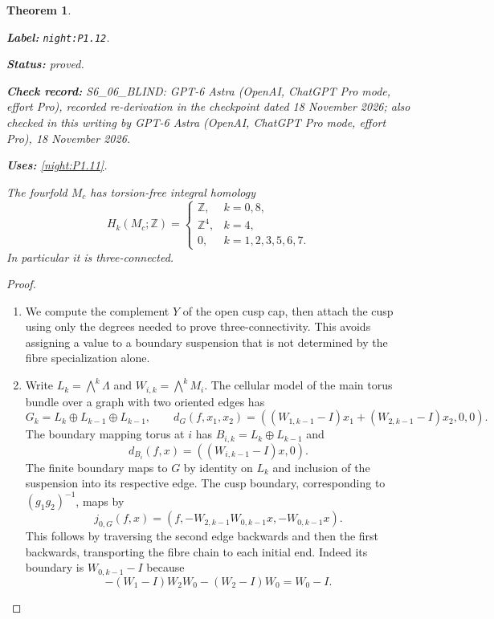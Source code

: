 \documentclass[11pt,a4paper]{article}
\newtheorem{theorem}{Theorem}[section]
\theoremstyle{definition}
\newcommand{\StatementRecord}[4]{\par\smallskip\begingroup\upshape\raggedright\noindent\textbf{Label:} \nolinkurl{#1}.\par\noindent\textbf{Status:} #2.\par\noindent\textbf{Check record:} #3.\par\noindent\textbf{Uses:} #4.\par\endgroup\smallskip}
\newcommand{\CurrentChecker}{GPT-6 Astra (OpenAI, ChatGPT Pro mode, effort Pro), 18 November 2026}
\begin{document}
\begin{theorem}\label{night:P1.12}
\StatementRecord{night:P1.12}{proved}{S6\_06\_BLIND: GPT-6 Astra (OpenAI, ChatGPT Pro mode, effort Pro), recorded re-derivation in the checkpoint dated 18 November 2026; also checked in this writing by \CurrentChecker}{\cref{night:P1.11}}
The fourfold $M_c$ has torsion-free integral homology
\[
H_k(M_c;\mathbb Z)=
\begin{cases}
\mathbb Z,&k=0,8,\\
\mathbb Z^4,&k=4,\\
0,&k=1,2,3,5,6,7.
\end{cases}
\]
In particular it is three-connected.
\end{theorem}
\begin{proof}
\begin{enumerate}[label=\arabic*.]
\item We compute the complement $Y$ of the open cusp cap, then attach the
cusp using only the degrees needed to prove three-connectivity.
This avoids assigning a value to a boundary suspension that is not
determined by the fibre specialization alone.

\item Write $L_k=\bigwedge^k\Lambda$ and $W_{i,k}=\bigwedge^kM_i$.
The cellular model of the main torus bundle over a graph with two
oriented edges has
\[
G_k=L_k\oplus L_{k-1}\oplus L_{k-1},\qquad
d_G(f,x_1,x_2)=((W_{1,k-1}-I)x_1+(W_{2,k-1}-I)x_2,0,0).
\tag{1.12.1}
\]
The boundary mapping torus at $i$ has
$B_{i,k}=L_k\oplus L_{k-1}$ and
\[
d_{B_i}(f,x)=((W_{i,k-1}-I)x,0).
\tag{1.12.2}
\]
The finite boundary maps to $G$ by identity on $L_k$ and inclusion
of the suspension into its respective edge.  The cusp boundary,
corresponding to $(g_1g_2)^{-1}$, maps by
\[
j_{0,G}(f,x)=(f,-W_{2,k-1}W_{0,k-1}x,-W_{0,k-1}x).
\tag{1.12.3}
\]
This follows by traversing the second edge backwards and then the
first backwards, transporting the fibre chain to each initial end.
Indeed its boundary is $W_{0,k-1}-I$ because
\[
-(W_1-I)W_2W_0-(W_2-I)W_0=W_0-I.
\]


\end{enumerate}
\end{proof}
\end{document}
